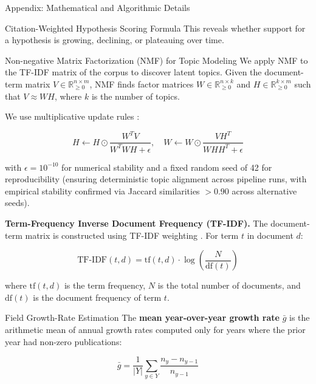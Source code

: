 \documentclass[
  ignorenonframetext,
]{beamer}
\begin{document}
\begin{frame}[fragile]{Appendix: Mathematical and Algorithmic Details
\label{sec:technical_appendix}}
\begin{block}{Citation-Weighted Hypothesis Scoring Formula
\label{sec:appendix_scoring}}
This reveals whether support for a hypothesis is growing, declining, or
plateauing over time.
\end{block}

\begin{block}{Non-negative Matrix Factorization (NMF) for Topic Modeling
\label{sec:appendix_nmf}}
\protect{}\label{non-negative-matrix-factorization-nmf-for-topic-modeling}
We apply NMF to the TF-IDF matrix of the corpus to discover latent
topics. Given the document-term matrix
\(V \in \mathbb{R}^{n \times m}_{\geq 0}\), NMF finds factor matrices
\(W \in \mathbb{R}^{n \times k}_{\geq 0}\) and
\(H \in \mathbb{R}^{k \times m}_{\geq 0}\) such that \(V \approx WH\),
where \(k\) is the number of topics.

We use multiplicative update rules \citep{lee1999nmf}:

\begin{equation}
H \leftarrow H \odot \frac{W^T V}{W^T W H + \epsilon}, \quad W \leftarrow W \odot \frac{V H^T}{W H H^T + \epsilon} \label{eq:nmf_update}
\end{equation}

with \(\epsilon = 10^{-10}\) for numerical stability and a fixed random
seed of 42 for reproducibility (ensuring deterministic topic alignment
across pipeline runs, with empirical stability confirmed via Jaccard
similarities \(> 0.90\) across alternative seeds).

\textbf{Term-Frequency Inverse Document Frequency (TF-IDF).} The
document-term matrix is constructed using TF-IDF weighting
\citep{salton1975vector}. For term \(t\) in document \(d\):

\begin{equation}
\text{TF-IDF}(t, d) = \text{tf}(t, d) \cdot \log\!\left(\frac{N}{\text{df}(t)}\right) \label{eq:tfidf}
\end{equation}

where \(\text{tf}(t, d)\) is the term frequency, \(N\) is the total
number of documents, and \(\text{df}(t)\) is the document frequency of
term \(t\).
\end{block}

\begin{block}{Field Growth-Rate Estimation \label{sec:appendix_growth}}
\protect{}\label{field-growth-rate-estimation}
The \textbf{mean year-over-year growth rate} \(\bar{g}\) is the
arithmetic mean of annual growth rates computed only for years where the
prior year had non-zero publications:

\begin{equation}
\bar{g} = \frac{1}{|Y|} \sum_{y \in Y} \frac{n_y - n_{y-1}}{n_{y-1}} \label{eq:mean_growth}
\end{equation}


\end{block}
\end{frame}
\end{document}
